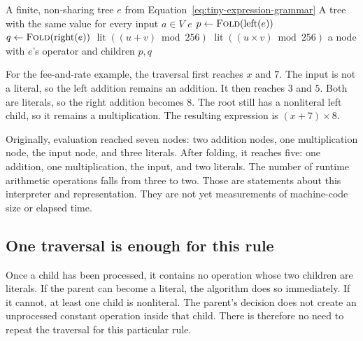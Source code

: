 \begin{algorithm}
  \caption{Fold constant operations in a finite expression tree.}
  \label{alg:tiny-fold}
  \begin{pseudocode}
    \Require A finite, non-sharing tree $e$ from Equation~\ref{eq:tiny-expression-grammar}
    \Ensure A tree with the same value for every input $a\in V$
        \State \Return $e$
      \EndIf
      \State $p\gets\Call{Fold}{\operatorname{left}(e)}$
      \State $q\gets\Call{Fold}{\operatorname{right}(e)}$
          \State \Return $\operatorname{lit}((u+v)\bmod256)$
        \Else
          \State \Return $\operatorname{lit}((u\times v)\bmod256)$
        \EndIf
      \EndIf
      \State \Return a node with $e$'s operator and children $p,q$
    \EndFunction
  \end{pseudocode}
\end{algorithm}

For the fee-and-rate example, the traversal first reaches $x$ and $7$.
The input is not a literal, so the left addition remains an addition.
It then reaches $3$ and $5$.
Both are literals, so the right addition becomes $8$.
The root still has a nonliteral left child, so it remains a multiplication.
The resulting expression is $(x+7)\times8$.

Originally, evaluation reached seven nodes: two addition nodes, one multiplication node, the input node, and three literals.
After folding, it reaches five: one addition, one multiplication, the input, and two literals.
The number of runtime arithmetic operations falls from three to two.
Those are statements about this interpreter and representation.
They are not yet measurements of machine-code size or elapsed time.

\subsection{One traversal is enough for this rule}
\label{sec:tiny-fold-complexity}

Once a child has been processed, it contains no operation whose two children are literals.
If the parent can become a literal, the algorithm does so immediately.
If it cannot, at least one child is nonliteral.
The parent's decision does not create an unprocessed constant operation inside that child.
There is therefore no need to repeat the traversal for this particular rule.

